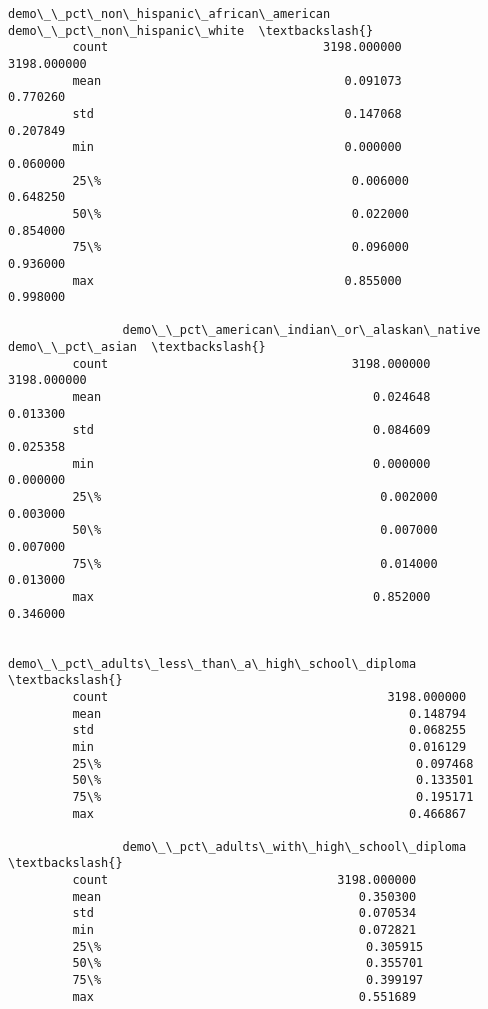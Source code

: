 \documentclass[11pt]{article}
\begin{document}
\begin{Verbatim}[commandchars=\\\{\}]
                demo\_\_pct\_non\_hispanic\_african\_american  demo\_\_pct\_non\_hispanic\_white  \textbackslash{}
         count                              3198.000000                   3198.000000   
         mean                                  0.091073                      0.770260   
         std                                   0.147068                      0.207849   
         min                                   0.000000                      0.060000   
         25\%                                   0.006000                      0.648250   
         50\%                                   0.022000                      0.854000   
         75\%                                   0.096000                      0.936000   
         max                                   0.855000                      0.998000   
         
                demo\_\_pct\_american\_indian\_or\_alaskan\_native  demo\_\_pct\_asian  \textbackslash{}
         count                                  3198.000000      3198.000000   
         mean                                      0.024648         0.013300   
         std                                       0.084609         0.025358   
         min                                       0.000000         0.000000   
         25\%                                       0.002000         0.003000   
         50\%                                       0.007000         0.007000   
         75\%                                       0.014000         0.013000   
         max                                       0.852000         0.346000   
         
                demo\_\_pct\_adults\_less\_than\_a\_high\_school\_diploma  \textbackslash{}
         count                                       3198.000000   
         mean                                           0.148794   
         std                                            0.068255   
         min                                            0.016129   
         25\%                                            0.097468   
         50\%                                            0.133501   
         75\%                                            0.195171   
         max                                            0.466867   
         
                demo\_\_pct\_adults\_with\_high\_school\_diploma  \textbackslash{}
         count                                3198.000000   
         mean                                    0.350300   
         std                                     0.070534   
         min                                     0.072821   
         25\%                                     0.305915   
         50\%                                     0.355701   
         75\%                                     0.399197   
         max                                     0.551689   
         

\end{Verbatim}
\end{document}

